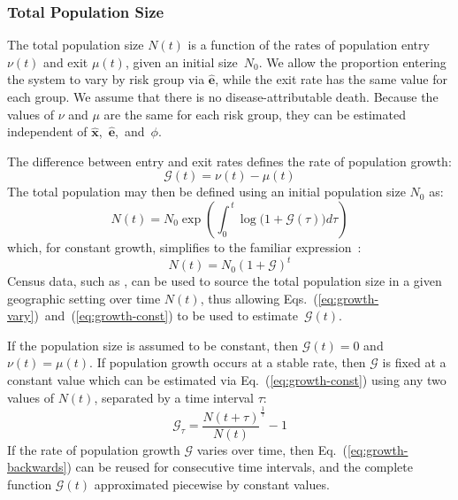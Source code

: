 \subsubsection{Total Population Size}
\label{aaa:params-nu-mu}
The total population size $N(t)$ is a function of
the rates of population entry $\nu(t)$ and exit $\mu(t)$, given an initial size~$N_0$.
We allow the proportion entering the system to vary by risk group via $\bm{\hat{e}}$,
while the exit rate has the same value for each group.
We assume that there is no disease-attributable death.
Because the values of $\nu$ and $\mu$ are the same for each risk group, 
they can be estimated independent of
$\bm{\hat{x}}$,~$\bm{\hat{e}}$,~and~$\phi$.
\par
The difference between entry and exit rates
defines the rate of population growth:
\begin{equation}\label{eq:growth-G}
\mathcal{G}(t) = \nu(t) - \mu(t) 
\end{equation}
The total population may then be defined using an initial population size $N_0$ as:
\begin{equation}\label{eq:growth-vary}
N(t) = N_0 \exp{\left(\int_{0}^{\,t}{\log\big(1+\mathcal{G}(\tau) \big)d\tau}\right)}
\end{equation}
which, for constant growth, simplifies to the familiar expression~\citep{Malthus1798}:
\begin{equation}\label{eq:growth-const}
N(t) = N_0 {(1 + \mathcal{G})}^{t}
\end{equation}
Census data, such as \citep{WorldBank}, can be used to source
the total population size in a given geographic setting over time $N(t)$,
thus allowing Eqs.~(\ref{eq:growth-vary})~and~(\ref{eq:growth-const})
to be used to estimate~$\mathcal{G}(t)$.
\par
If the population size is assumed to be constant,
then $\mathcal{G}(t) = 0$ and $\nu(t) = \mu(t)$.
If population growth occurs at a stable rate, then
$\mathcal{G}$ is fixed at a constant value
which can be estimated via Eq.~(\ref{eq:growth-const})
using any two values of $N(t)$, separated by a time interval $\tau$:
\begin{equation}\label{eq:growth-backwards}
\mathcal{G}_{\tau} = {\frac{N(t+\tau)}{N(t)}}^{\frac{1}{\tau}} -1
\end{equation}
If the rate of population growth $\mathcal{G}$ varies over time,
then Eq.~(\ref{eq:growth-backwards}) can be reused for consecutive time intervals,
and the complete function $\mathcal{G}(t)$ approximated piecewise by constant values.
